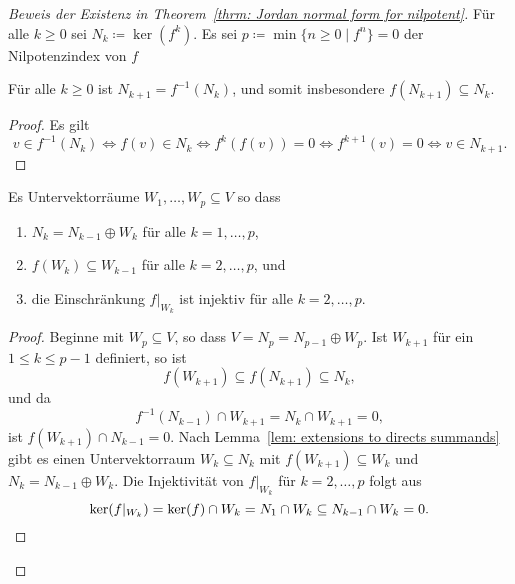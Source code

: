 \begin{proof}[Beweis der Existenz in Theorem~\ref{thrm: Jordan normal form for nilpotent}]
  Für alle $k \geq 0$ sei $N_k \coloneqq \ker(f^k)$.
  Es sei $p \coloneqq \min \{n \geq 0 \mid f^n\} = 0$ der Nilpotenzindex von $f$
  
  \begin{claim}
    Für alle $k \geq 0$ ist $N_{k+1} = f^{-1}(N_k)$, und somit insbesondere $f(N_{k+1}) \subseteq N_k$.
  \end{claim}
  \begin{proof}
    Es gilt
    \[
      v \in f^{-1}(N_k)
      \iff
      f(v) \in N_k
      \iff
      f^k(f(v)) = 0
      \iff
      f^{k+1}(v) = 0
      \iff
      v \in N_{k+1}.
    \]
  \end{proof}
  
  \begin{claim}
    Es Untervektorräume $W_1, \dotsc, W_p \subseteq V$ so dass
    \begin{enumerate}[leftmargin=*, label=\roman*)]
      \item
        $N_k = N_{k-1} \oplus W_k$ für alle $k = 1, \dotsc, p$,
      \item
        $f(W_k) \subseteq W_{k-1}$ für alle $k = 2, \dotsc, p$, und
      \item
        die Einschränkung $f|_{W_k}$ ist injektiv für alle $k = 2, \dotsc, p$.
    \end{enumerate}
  \end{claim}
  \begin{proof}
    Beginne mit $W_p \subseteq V$, so dass $V = N_p = N_{p-1} \oplus W_p$.
    Ist $W_{k+1}$ für ein $1 \leq k \leq p-1$ definiert, so ist
    \[
      f(W_{k+1}) \subseteq f(N_{k+1}) \subseteq N_k,
    \]
    und da
    \[
      f^{-1}(N_{k-1}) \cap W_{k+1}
      = N_k \cap W_{k+1}
      = 0,
    \]
    ist $f(W_{k+1}) \cap N_{k-1} = 0$.
    Nach Lemma~\ref{lem: extensions to directs summands} gibt es einen Untervektorraum $W_k \subseteq N_k$ mit $f(W_{k+1}) \subseteq W_k$ und $N_k = N_{k-1} \oplus W_k$.
    Die Injektivität von $f|_{W_k}$ für $k = 2, \dotsc, p$ folgt aus
    \[
        \ker(f|_{W_k})
      = \ker(f) \cap W_k
      = N_1 \cap W_k
      \subseteq N_{k-1} \cap W_k
      = 0.
      \qedhere
    \]
  \end{proof}
  

\end{proof}
